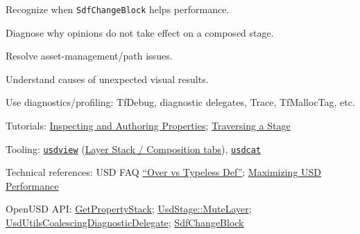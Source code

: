 
\begin{Objectives}
  \item Recognize when \texttt{SdfChangeBlock} helps performance.
  \item Diagnose why opinions do not take effect on a composed stage.
  \item Resolve asset-management/path issues.
  \item Understand causes of unexpected visual results.
  \item Use diagnostics/profiling: TfDebug, diagnostic delegates, Trace,
        TfMallocTag, etc.
\end{Objectives}

\begin{Resources}
  \item Tutorials: \href{https://openusd.org/release/tut_inspect_and_author_props.html}{Inspecting and Authoring Properties}; \href{https://openusd.org/release/tut_traversing_stage.html}{Traversing a Stage}
  \item Tooling: \href{https://openusd.org/release/toolset.html#usdview}{\texttt{usdview}}
        (\href{https://docs.omniverse.nvidia.com/usd/latest/usdview/panel_composition.html#layer-stack}{Layer Stack / Composition tabs}),
        \href{https://openusd.org/release/toolset.html#usdcat}{\texttt{usdcat}}
  \item Technical references: USD FAQ \href{https://openusd.org/release/usdfaq.html#what-s-the-difference-between-an-over-and-a-typeless-def}{``Over vs Typeless Def''};
        \href{https://openusd.org/release/maxperf.html}{Maximizing USD Performance}
  \item OpenUSD API: \href{https://openusd.org/release/api/class_usd_property.html}{GetPropertyStack};
        \href{https://openusd.org/release/api/class_usd_stage.html}{UsdStage::MuteLayer};
        \href{https://openusd.org/release/api/class_usd_utils_coalescing_diagnostic_delegate.html}{UsdUtilsCoalescingDiagnosticDelegate};
        \href{https://openusd.org/release/api/class_sdf_change_block.html}{SdfChangeBlock}
\end{Resources}

